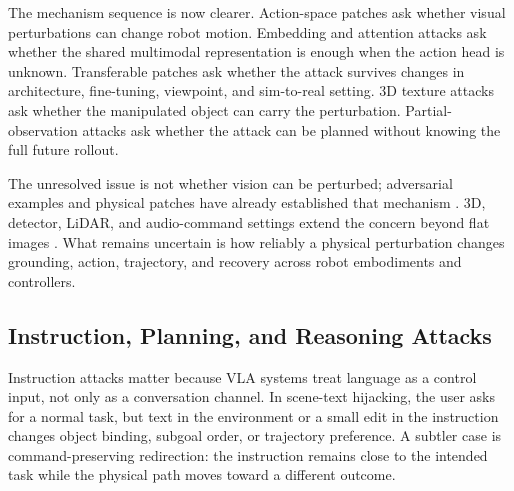 The mechanism sequence is now clearer. Action-space patches ask whether visual perturbations can change robot motion. Embedding and attention attacks ask whether the shared multimodal representation is enough when the action head is unknown. Transferable patches ask whether the attack survives changes in architecture, fine-tuning, viewpoint, and sim-to-real setting. 3D texture attacks ask whether the manipulated object can carry the perturbation. Partial-observation attacks ask whether the attack can be planned without knowing the full future rollout.

The unresolved issue is not whether vision can be perturbed; adversarial examples and physical patches have already established that mechanism \cite{szegedy2014intriguing,goodfellow2015explaining,papernot2016limitations,carlini2017towards,brown2017adversarial} \cite{kurakin2017physical,moosavi2017universal,madry2018towards,athalye2018synthesizing,eykholt2018robust}. 3D, detector, LiDAR, and audio-command settings extend the concern beyond flat images \cite{eykholt2018detectors,chen2018shapeshifter,thys2019fooling,xu2020tshirt,xiao2019meshadv} \cite{tu2020lidar,sun2020robustlidar,cao2021invisible,cao2019lidar,carlini2016hiddenvoice} \cite{zhang2017dolphinattack,yuan2018commandersong,sugawara2020lightcommands}. What remains uncertain is how reliably a physical perturbation changes grounding, action, trajectory, and recovery across robot embodiments and controllers.

\subsection{Instruction, Planning, and Reasoning Attacks}

Instruction attacks matter because VLA systems treat language as a control input, not only as a conversation channel. In scene-text hijacking, the user asks for a normal task, but text in the environment or a small edit in the instruction changes object binding, subgoal order, or trajectory preference. A subtler case is command-preserving redirection: the instruction remains close to the intended task while the physical path moves toward a different outcome.

